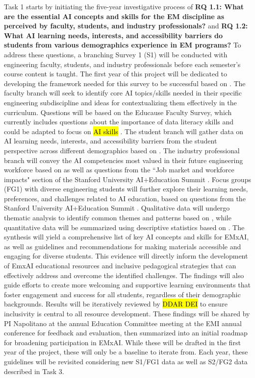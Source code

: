 \documentclass[11pt]{article}
\begin{document}
Task 1 starts by initiating the five-year investigative process of \textbf{RQ 1.1: What are the essential AI concepts and skills for the EM discipline as perceived by faculty, students, and industry professionals?} and \textbf{RQ 1.2: What AI learning needs, interests, and accessibility barriers do students from various demographics experience in EM programs?}
To address these questions, a branching Survey 1 (S1) will be conducted with engineering faculty, students, and industry professionals before each semester's course content is taught. 
The first year of this project will be dedicated to developing the framework needed for this survey to be successful based on \cite{cossa2021seven}.
The faculty branch will seek to identify core AI topics/skills needed in their specific engineering subdiscipline and ideas for contextualizing them effectively in the curriculum. Questions will be based on the Educause Faculty Survey, which currently includes questions about the importance of data literacy skills and could be adapted to focus on \hl{AI skills} \cite{xxx}.
The student branch will gather data on AI learning needs, interests, and accessibility barriers from the student perspective across different demographics based on \cite{Hart-Research-Youth-AI-Survey-Results42}. 
The industry professional branch will convey the AI competencies most valued in their future engineering workforce based on \cite{PwC-AI-Study} as well as questions from the ``Job market and workforce impacts" section of the Stanford University AI+Education Summit \cite{AIEducationSummit2024}.  
Focus groups (FG1) with diverse engineering students will further explore their learning needs, preferences, and challenges related to AI education, based on questions from the Stanford University AI+Education Summit \cite{AIEducationSummit2024}.
Qualitative data will undergo thematic analysis to identify common themes and patterns based on \cite{walker2024mixed}, while quantitative data will be summarized using descriptive statistics based on \cite{walker2024mixed}. 
The synthesis will yield a comprehensive list of key AI concepts and skills for EMxAI, as well as guidelines and recommendations for making materials accessible and engaging for diverse students. 
This evidence will directly inform the development of EmxAI educational resources and inclusive pedagogical strategies that can effectively address and overcome the identified challenges. 
The findings will also guide efforts to create more welcoming and supportive learning environments that foster engagement and success for all students, regardless of their demographic backgrounds. Results will be iteratively reviewed by \hl{DDAR DEI} to ensure inclusivity is central to all resource development.
These findings will be shared by PI Napolitano at the annual Education Committee meeting at the EMI annual conference for feedback and evaluation, then summarized into an initial roadmap for broadening participation in EMxAI.
While these will be drafted in the first year of the project, these will only be a baseline to iterate from. Each year, these guidelines will be revisited considering new S1/FG1 data as well as S2/FG2 data described in Task 3. 
\end{document}
